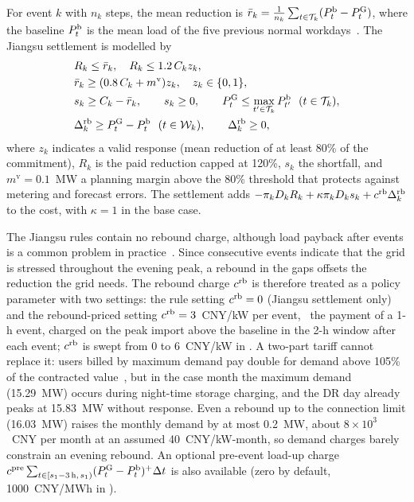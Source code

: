 For event $k$ with $n_k$ steps, the mean reduction is $\bar r_k=\frac1{n_k}\sum_{t\in\mathcal{T}_k}(P^{\mathrm{b}}_t-P^{\mathrm{G}}_t)$, where the
baseline $P^{\mathrm{b}}_t$ is the mean load of the five previous normal workdays~\cite{jiangsu2024dr}. The Jiangsu settlement is
modelled by
\begin{align}
&R_k\le\bar r_k,\quad R_k\le1.2\,C_kz_k,\nonumber\\
&\bar r_k\ge(0.8\,C_k+m^{\mathrm{v}})z_k,\quad z_k\in\{0,1\},\label{eq:valid}\\
&s_k\ge C_k-\bar r_k,\qquad s_k\ge0,\qquad P^{\mathrm{G}}_t\le\max_{t'\in\mathcal{T}_k}P^{\mathrm{b}}_{t'}\ \ (t\in\mathcal{T}_k),\label{eq:short}\\
&\Delta^{\mathrm{rb}}_k\ge P^{\mathrm{G}}_t-P^{\mathrm{b}}_t\ \ (t\in\mathcal{W}_k),\qquad \Delta^{\mathrm{rb}}_k\ge0,\label{eq:rebound}
\end{align}
where $z_k$ indicates a valid response (mean reduction of at least 80\% of the commitment), $R_k$ is the paid reduction
capped at 120\%, $s_k$ the shortfall, and $m^{\mathrm{v}}=0.1$~MW a planning margin above the 80\% threshold that
protects against metering and forecast errors. The settlement adds $-\pi_kD_kR_k+\kappa\pi_kD_ks_k+c^{\mathrm{rb}}\Delta^{\mathrm{rb}}_k$
to the cost, with $\kappa=1$ in the base case.

The Jiangsu rules contain no rebound charge, although load payback after events is a common problem in
practice~\cite{wrinch2012}. Since consecutive events indicate that the grid is stressed throughout the evening peak, a
rebound in the gaps offsets the reduction the grid needs. The rebound charge $c^{\mathrm{rb}}$ is therefore treated as a policy
parameter with two settings: the rule setting $c^{\mathrm{rb}}=0$ (Jiangsu settlement only) and the rebound-priced setting
$c^{\mathrm{rb}}=3$~CNY/kW per event, \ie\ the payment of a 1-h event, charged on the peak import above the baseline in the 2-h
window after each event; $c^{\mathrm{rb}}$ is swept from 0 to 6~CNY/kW in . A two-part tariff cannot
replace it: users billed by maximum demand pay double for demand above 105\% of the contracted value~\cite{ndrc2016demand},
but in the case month the maximum demand (15.29~MW) occurs during night-time storage charging, and the DR day already
peaks at 15.83~MW without response. Even a rebound up to the connection limit (16.03~MW) raises the monthly demand by at
most 0.2~MW, about $8\times10^3$~CNY per month at an assumed 40~CNY/kW-month, so demand charges barely constrain an
evening rebound. An optional pre-event load-up charge
$c^{\mathrm{pre}}\sum_{t\in[s_1-3\,\mathrm{h},\,s_1)}(P^{\mathrm{G}}_t-P^{\mathrm{b}}_t)^+\Delta t$ is also available (zero by default,
1000~CNY/MWh in ).
